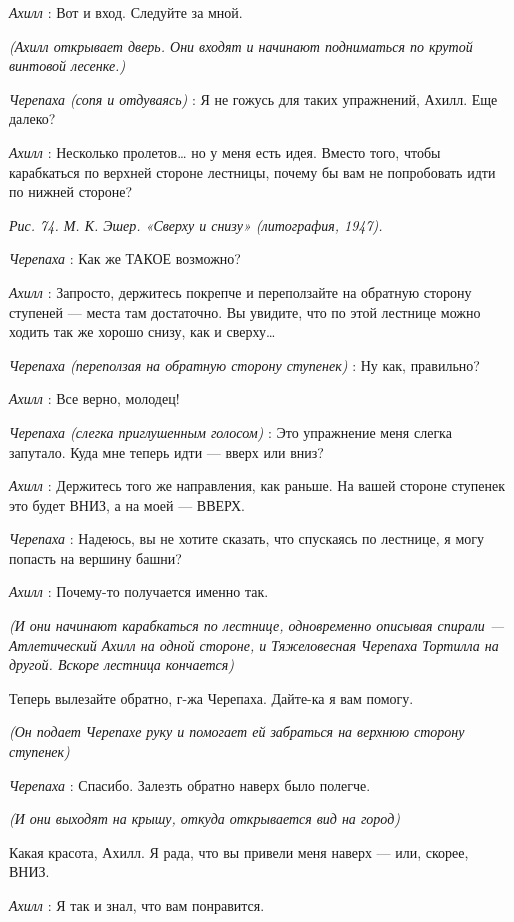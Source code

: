 \documentclass[../main.tex]{subfiles}
\begin{document}
\begin{dialogue}
\emph{Ахилл} : Вот и вход. Следуйте за мной.

\emph{(Ахилл открывает дверь. Они входят и начинают подниматься по крутой винтовой лесенке.)}

\emph{Черепаха (сопя и отдуваясь)} : Я не гожусь для таких упражнений, Ахилл. Еще далеко?

\emph{Ахилл} : Несколько пролетов\ldots{} но у меня есть идея. Вместо того, чтобы карабкаться по верхней стороне лестницы, почему бы вам не попробовать идти по нижней стороне?

\emph{Рис. 74. М. К. Эшер. «Сверху и снизу» (литография, 1947).}

\emph{Черепаха} : Как же ТАКОЕ возможно?

\emph{Ахилл} : Запросто, держитесь покрепче и переползайте на обратную сторону ступеней --- места там достаточно. Вы увидите, что по этой лестнице можно ходить так же хорошо снизу, как и сверху\ldots{}

\emph{Черепаха (переползая на обратную сторону ступенек)} : Ну как, правильно?

\emph{Ахилл} : Все верно, молодец!

\emph{Черепаха (слегка приглушенным голосом)} : Это упражнение меня слегка запутало. Куда мне теперь идти --- вверх или вниз?

\emph{Ахилл} : Держитесь того же направления, как раньше. На вашей стороне ступенек это будет ВНИЗ, а на моей --- ВВЕРХ.

\emph{Черепаха} : Надеюсь, вы не хотите сказать, что спускаясь по лестнице, я могу попасть на вершину башни?

\emph{Ахилл} : Почему-то получается именно так.

\emph{(И они начинают карабкаться по лестнице, одновременно описывая спирали --- Атлетический Ахилл на одной стороне, и Тяжеловесная Черепаха Тортилла на другой. Вскоре лестница кончается)}

Теперь вылезайте обратно, г-жа Черепаха. Дайте-ка я вам помогу.

\emph{(Он подает Черепахе руку и помогает ей забраться на верхнюю сторону ступенек)}

\emph{Черепаха} : Спасибо. Залезть обратно наверх было полегче.

\emph{(И они выходят на крышу, откуда открывается вид на город)}

Какая красота, Ахилл. Я рада, что вы привели меня наверх --- или, скорее, ВНИЗ.

\emph{Ахилл} : Я так и знал, что вам понравится.


\end{dialogue}
\end{document}
